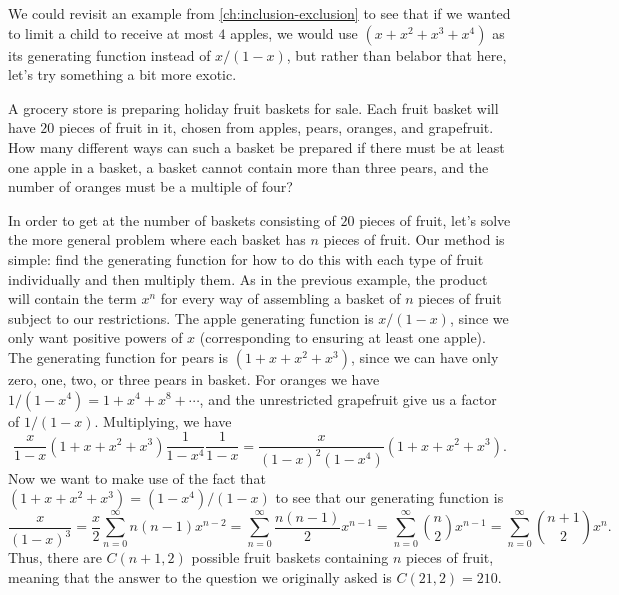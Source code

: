 We could revisit an example from \autoref{ch:inclusion-exclusion} to
see that if we wanted to limit a child to receive at most $4$ apples,
we would use $(x+x^2+x^3+x^4)$ as its generating function instead of
$x/(1-x)$, but rather than belabor that here, let's try something a
bit more exotic.

\begin{example}
  A grocery store is preparing holiday fruit baskets for sale. Each
  fruit basket will have $20$ pieces of fruit in it, chosen from
  apples, pears, oranges, and grapefruit. How many different ways can
  such a basket be prepared if there must be at least one apple in a
  basket, a basket cannot contain more than three pears, and the
  number of oranges must be a multiple of four?

  In order to get at the number of baskets consisting of $20$ pieces
  of fruit, let's solve the more general problem where each basket has
  $n$ pieces of fruit. Our method is simple: find the generating
  function for how to do this with each type of fruit individually and
  then multiply them. As in the previous example, the product will
  contain the term $x^n$ for every way of assembling a basket of $n$
  pieces of fruit subject to our restrictions. The apple generating
  function is $x/(1-x)$, since we only want positive powers of $x$
  (corresponding to ensuring at least one apple). The generating
  function for pears is $(1+x+x^2+x^3)$, since we can have only zero,
  one, two, or three pears in basket. For oranges we have $1/(1-x^4) =
  1+x^4+x^8+\cdots$, and the unrestricted grapefruit give us a factor
  of $1/(1-x)$. Multiplying, we have
  \[\frac{x}{1-x} (1+x+x^2+x^3) \frac{1}{1-x^4} \frac{1}{1-x} =
  \frac{x}{(1-x)^2(1-x^4)} (1+x+x^2+x^3).\] Now we want to make use of
  the fact that $(1+x+x^2+x^3) =(1-x^4)/(1-x)$ to see that our
  generating function is
  \[\frac{x}{(1-x)^3} = \frac{x}{2}\sum_{n=0}^\infty n(n-1)x^{n-2} =
  \sum_{n=0}^\infty\frac{n(n-1)}{2} x^{n-1} =
  \sum_{n=0}^\infty\binom{n}{2} x^{n-1} =
  \sum_{n=0}^\infty\binom{n+1}{2} x^n.\]
  Thus, there are $C(n+1,2)$ possible fruit baskets containing $n$
  pieces of fruit, meaning that the answer to the question we
  originally asked is $C(21,2) = 210$.
\end{example}

